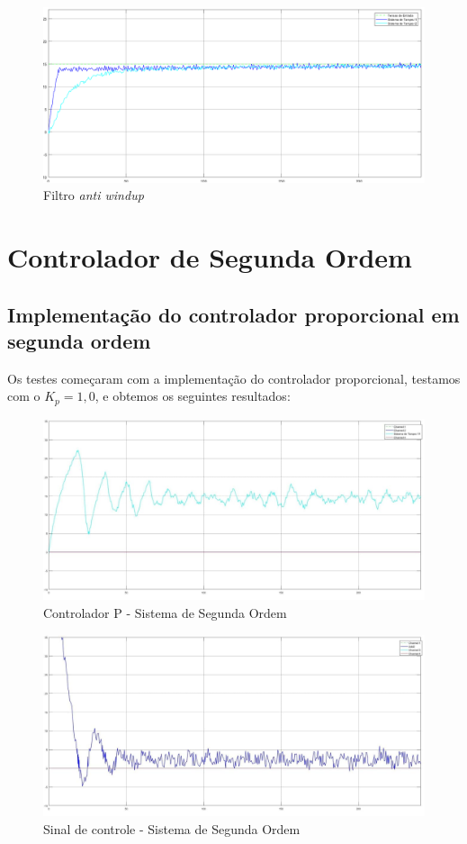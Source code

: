 \documentclass[
	12pt,				%
	openany,			%
	oneside,			%
	a4paper,			%
	english,			%
	french,				%
	spanish,			%
	brazil,				%
	]{abntex2}
\begin{document}
{\begin{figure}[h]
	\centering
	\includegraphics[scale=0.25]{Filtro_windup_1.png}
	\caption{Filtro \textit{anti windup}}
\end{figure}

\section{Controlador de Segunda Ordem}
 
\subsection{Implementação do controlador proporcional em segunda ordem}
 
Os testes começaram com a implementação do controlador proporcional, testamos com o $K_p = 1,0$, e obtemos os seguintes resultados:

\begin{figure}[h]
	\centering
	\includegraphics[scale=0.50]{7 - controlador_P_SO.jpg}
	\caption{Controlador P - Sistema de Segunda Ordem}
\end{figure}

\begin{figure}[h]
	\centering
	\includegraphics[scale=0.50]{7 - sinal_controle_P_SO.jpg}
	\caption{Sinal de controle - Sistema de Segunda Ordem}
\end{figure}

}
\end{document}

